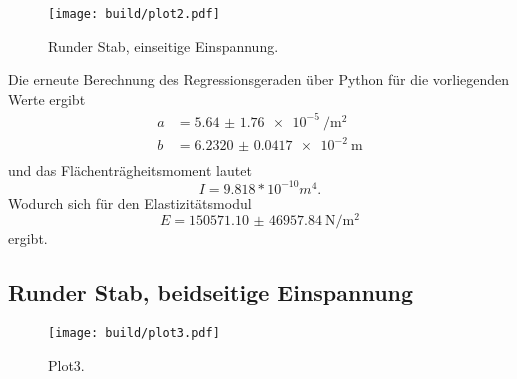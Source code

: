 \begin{figure}[h]
  \centering
  \texttt{[image: build/plot2.pdf]}
  \caption{Runder Stab, einseitige Einspannung.}
  \label{fig:plot2}
\end{figure}

Die erneute Berechnung des Regressionsgeraden über Python
für die vorliegenden Werte ergibt
\begin{align*}
  a &= \SI{5.64(176)e-5}{\per\square\meter} \\
  b &= \SI{6.2320(417)e-2}{\meter} \\
\end{align*}
und das Flächenträgheitsmoment lautet
\begin{equation*}
  I = 9.818* 10^{-10} m^4.
\end{equation*}
\newline
Wodurch sich für den Elastizitätsmodul
\begin{equation*}
  E = \SI{150571.10(4695784)}{\newton\per\square\meter}
\end{equation*}
ergibt.

\subsection{Runder Stab, beidseitige Einspannung}
\begin{figure}
  \centering
  \texttt{[image: build/plot3.pdf]}
  \caption{Plot3.}
  \label{fig:plot3}
\end{figure}
